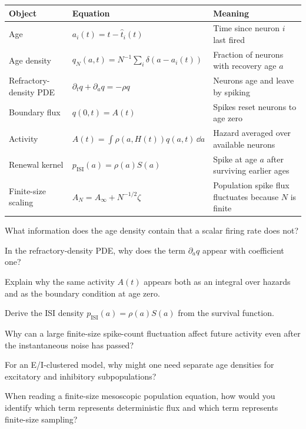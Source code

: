 \begin{chaptersummary}

\begin{center}
\renewcommand{\arraystretch}{1.55}
\begin{tabularx}{\textwidth}{@{}l X X@{}}
  \toprule
  \textbf{Object} & \textbf{Equation} & \textbf{Meaning} \\
  \midrule
  Age &
  $a_i(t)=t-\hat t_i(t)$ &
  Time since neuron $i$ last fired \\
  Age density &
  $q_N(a,t)=N^{-1}\sum_i\delta(a-a_i(t))$ &
  Fraction of neurons with recovery age $a$ \\
  Refractory-density PDE &
  $\partial_t q+\partial_a q=-\rho q$ &
  Neurons age and leave by spiking \\
  Boundary flux &
  $q(0,t)=A(t)$ &
  Spikes reset neurons to age zero \\
  Activity &
  $A(t)=\int\rho(a,H(t))q(a,t)\,\dd a$ &
  Hazard averaged over available neurons \\
  Renewal kernel &
  $p_{\mathrm{ISI}}(a)=\rho(a)S(a)$ &
  Spike at age $a$ after surviving earlier ages \\
  Finite-size scaling &
  $A_N=A_\infty+N^{-1/2}\zeta$ &
  Population spike flux fluctuates because $N$ is finite \\
  \bottomrule
\end{tabularx}
\end{center}

\end{chaptersummary}

\begin{conceptquestions}
  \item What information does the age density contain that a scalar firing rate does not?
  \item In the refractory-density PDE, why does the term $\partial_a q$ appear with coefficient one?
  \item Explain why the same activity $A(t)$ appears both as an integral over hazards and as the boundary condition at age zero.
  \item Derive the ISI density $p_{\mathrm{ISI}}(a)=\rho(a)S(a)$ from the survival function.
  \item Why can a large finite-size spike-count fluctuation affect future activity even after the instantaneous noise has passed?
  \item For an E/I-clustered model, why might one need separate age densities for excitatory and inhibitory subpopulations?
  \item When reading a finite-size mesoscopic population equation, how would you identify which term represents deterministic flux and which term represents finite-size sampling?
\end{conceptquestions}
